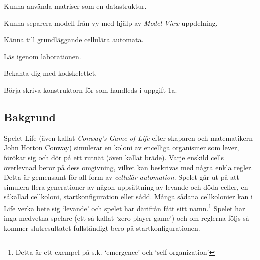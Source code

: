 


\Lab{\LabWeekTWELVE}

\begin{Goals}
    \item Kunna använda matriser som en datastruktur.
    \item Kunna separera modell från vy med hjälp av \emph{Model-View} uppdelning.
    \item Känna till grundläggande cellulära automata. %
\end{Goals}


\begin{Preparations}
    \item Läs igenom laborationen.
    \item Bekanta dig med kodskelettet.
    \item Börja skriva konstruktorn för  som handleds i uppgift 1a.
\end{Preparations}

\subsection{Bakgrund}

Spelet Life (även kallat \emph{Conway's Game of Life} efter skaparen och matematikern John Horton Conway) simulerar en koloni av encelliga organismer som lever, förökar sig och dör på ett rutnät (även kallat bräde). Varje enskild cells överlevnad beror på dess omgivning, vilket kan beskrivas med några enkla regler. Detta är gemensamt för all form av \emph{cellulär automation}. Spelet går ut på att simulera flera generationer av någon uppsättning av levande och döda celler, en såkallad cellkoloni, startkonfiguration eller sådd. Många sådana cellkolonier kan i Life verka bete sig `levande' och spelet har därifrån fått sitt namn.\footnote{Detta är ett exempel på s.k. `emergence' och `self-organization'} Spelet har inga medvetna spelare (ett så kallat `zero-player game') och om reglerna följs så kommer slutresultatet fullständigt bero på startkonfigurationen.

